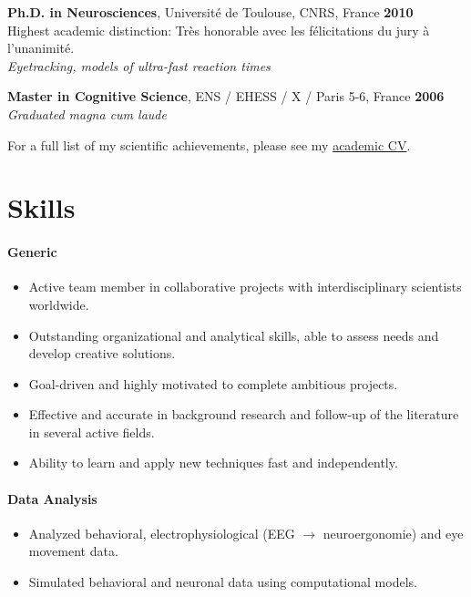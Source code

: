 \documentclass[margin,line]{resume}
\begin{document}
\begin{resume}
	\vspace{-1.5mm}	
         \textbf{Ph.D. in Neurosciences}, Université de Toulouse, CNRS, France \hfill \textbf{2010}\\
	Highest academic distinction: Très honorable avec les félicitations du jury à l'unanimité.\\
	\textsl{Eyetracking, models of ultra-fast reaction times}
	
	\vspace{-1.5mm}
	\textbf{Master in Cognitive Science}, ENS / EHESS / X / Paris 5-6, France  \hfill \textbf{2006}\\
	\textsl{Graduated magna cum laude}
	
	\vspace{-1.5mm}
	For a full list of my scientific achievements, please see my \href{http://scrouzet.github.io/cv/CVSebastienCrouzet.pdf}{academic CV}.



    \vspace{3mm}
    \section{\mysidestyle Skills}
    \vspace{-0.5mm}

	\paragraph{Generic}
	\begin{itemize} \itemsep1pt \parskip0pt  \leftmargin=0em \itemindent=-1.5em
  		\item Active team member in collaborative projects with interdisciplinary scientists worldwide.
  		\item Outstanding organizational and analytical skills, able to assess needs and develop creative solutions. 
  		\item Goal-driven and highly motivated to complete ambitious projects.
  		\item Effective and accurate in background research and follow-up of the literature in several active fields.
  		\item Ability to learn and apply new techniques fast and independently.
	\end{itemize}

	\paragraph{Data Analysis}
	\begin{itemize} \itemsep1pt \parskip0pt  \leftmargin=0em \itemindent=-1.5em
  	\item Analyzed behavioral, electrophysiological (EEG $\rightarrow$ neuroergonomie) and eye movement data.
	\item Simulated behavioral and neuronal data using computational models.
	\end{itemize}
		

\end{resume}
\end{document}

